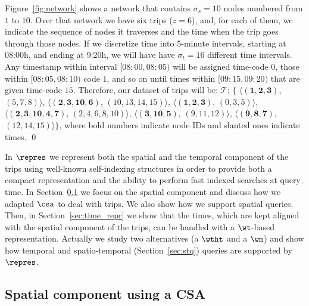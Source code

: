 \begin{example} \label{exp:ctr}
Figure~\ref{fig:network} shows a network that contains $\sigma_s=10$ nodes 
numbered from $1$ to $10$. Over that network we have six trips ($z=6$),
and, for each of them, we indicate the sequence of nodes it traverses
and the time when the trip goes through those nodes. If we discretize time into
5-minute intervals, starting at 08:00h, and ending at 9:20h, we will have
have $\sigma_t=16$ different time intervals. Any timestamp within
interval $\mathit{[08\!:\!00,08\!:\!05)}$ will
be assigned time-code $0$, those within $\mathit{[08\!:\!05,08\!:\!10)}$ code $1$, and so on until
times within $\mathit{[09\!:\!15,09\!:\!20)}$ that are given time-code $15$.  
Therefore, our dataset of trips will be: 
$\mathcal{T}$: $\{$%
$\langle (\mathbf{1,2,3     })$, $(\mathit{5,7,8})                     \rangle$, 
$\langle (\mathbf{2,3,10,6  })$, $(\mathit{10,13,14,15})           \rangle$, 
$\langle (\mathbf{1,2,3     })$, $(\mathit{0,3,5})                     \rangle$, 
$\langle (\mathbf{2,3,10,4,7})$, $(\mathit{2,4,6,8,10}) \rangle$, 
$\langle (\mathbf{3,10,5    })$, $(\mathit{9,11,12})                     \rangle$, 
$\langle (\mathbf{9,8,7     })$, $(\mathit{12,14,15})                    \rangle$$\}$, 
where bold numbers indicate node IDs and slanted ones indicate times. \qed
\end{example}

In $\repres$ we represent both the spatial and the temporal component of the trips using well-known
self-indexing structures in order to provide both a compact representation and the ability to 
perform fast indexed searches at query time. In Section~\ref{sec:transnet_repr} we focus on the
spatial component and discuss how we adapted  $\csa$ to deal with trips. We also
show how we support spatial queries. Then, in Section~\ref{sec:time_repr} we show that the times,
which are kept aligned with the spatial component of the trips, can be handled with   
a $\wt$-based representation. Actually we study two alternatives (a $\wtht$ and a $\wm$) 
and show how temporal and spatio-temporal (Section~\ref{sec:stq}) queries are supported by $\repres$.

\subsection{Spatial component using a CSA}
\label{sec:transnet_repr}

